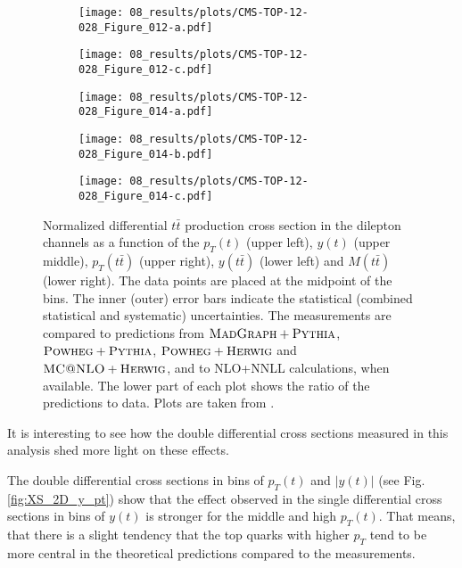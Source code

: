 \begin{sidewaysfigure}[p]
\centering
\begin{subfigure}
  \centering
  \texttt{[image: 08\_results/plots/CMS-TOP-12-028\_Figure\_012-a.pdf]}
\end{subfigure}
\begin{subfigure}
  \centering
  \texttt{[image: 08\_results/plots/CMS-TOP-12-028\_Figure\_012-c.pdf]}
\end{subfigure}
\begin{subfigure}
  \centering
  \texttt{[image: 08\_results/plots/CMS-TOP-12-028\_Figure\_014-a.pdf]}
\end{subfigure}
\begin{subfigure}
  \centering
  \texttt{[image: 08\_results/plots/CMS-TOP-12-028\_Figure\_014-b.pdf]}
\end{subfigure}
\begin{subfigure}
  \centering
  \texttt{[image: 08\_results/plots/CMS-TOP-12-028\_Figure\_014-c.pdf]}
\end{subfigure}
\caption{Normalized differential $t\bar{t}$ production cross section in the dilepton channels as a function of the $p_{T}(t)$ (upper left), $y(t)$ (upper middle), 
         $p_{T}(t\bar{t})$ (upper right), $y(t\bar{t})$ (lower left) and $M(t\bar{t})$ (lower right). The data points are placed at the midpoint of the bins. The 
         inner (outer) error bars indicate the statistical (combined statistical and systematic) uncertainties. The measurements are compared to predictions from 
         $\textsc{MadGraph}+\textsc{Pythia}$, $\textsc{Powheg}+\textsc{Pythia}$, $\textsc{Powheg}+\textsc{Herwig}$ and $\textsc{MC@NLO}+\textsc{Herwig}$, and to NLO+NNLL \cite{Ferroglia:2013zwa, Li:2013mia} calculations, when available. 
         The lower part of each plot shows the ratio of the predictions to data. Plots are taken from \cite{Khachatryan:2015oqa}.}
\label{fig:XSec_1d}
\end{sidewaysfigure}

It is interesting to see how the double differential cross sections measured in this analysis shed more light on these effects.

The double differential cross sections in bins of $p_{T}(t)$ and $|y(t)|$ (see Fig. \ref{fig:XS_2D_y_pt}) show that the effect observed in
the single differential cross sections in bins of $y(t)$ is stronger for the middle and high $p_{T}(t)$. That means, that there is a slight 
tendency that the top quarks with higher $p_{T}$ tend to be more central in the theoretical predictions compared to the measurements.

